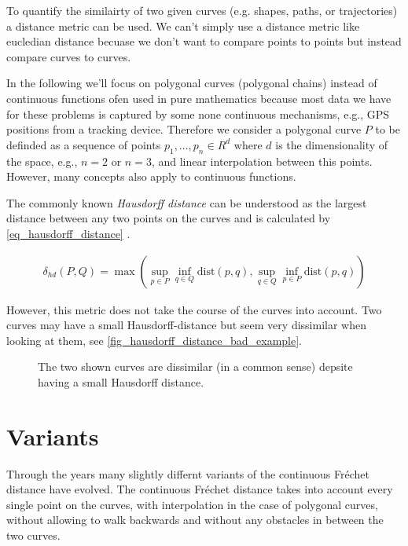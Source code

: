 \documentclass[
oneside,
fontsize=11pt
]{scrartcl}
\begin{document}
To quantify the similairty of two given curves (e.g. shapes, paths, or trajectories)
a distance metric can be used. 
We can't simply use a distance metric like eucledian distance 
becuase we don't want to compare points to points 
but instead compare curves to curves. 

In the following we'll focus on polygonal curves (polygonal chains) 
instead of continuous functions ofen used in pure mathematics 
because most data we have for these problems is 
captured by some none continuous mechanisms, e.g., GPS positions from a tracking device.
Therefore we consider a polygonal curve $P$ to be definded as a 
sequence of points $p_1, \dots, p_n \in R^d$ where $d$ is the dimensionality 
of the space, e.g., $n=2$ or $n=3$, and linear interpolation between this points. 
However, many concepts also apply to continuous functions.


The commonly known \textit{Hausdorff distance} can be understood 
as the largest distance between any two points on the curves 
and is calculated by \autoref{eq_hausdorff_distance} \cite{alt_computing_1995}.

\begin{align}
  \label{eq_hausdorff_distance}
  \delta_{hd}(P,Q) = \max \left( \sup_{p \in P} \inf_{q \in Q} \text{dist}(p,q), \sup_{q \in Q} \inf_{p \in P} \text{dist}(p,q) \right)
\end{align}

However, this metric does not take the course of the curves into account. 
Two curves may have a small Hausdorff-distance but seem very dissimilar 
when looking at them, see \autoref{fig_hausdorff_distance_bad_example}.

\begin{figure}[ht]
  \caption[Hausdorff distance of two dissimilar curves]{The two shown curves are dissimilar (in a common sense) depsite having a small Hausdorff distance.}
  \label{fig_hausdorff_distance_bad_example}
\end{figure}







\section{Variants}
Through the years many slightly differnt variants of the continuous Fréchet distance have evolved. 
The continuous Fréchet distance takes into account every single point on the curves, 
with interpolation in the case of polygonal curves, 
without allowing to walk backwards 
and without any obstacles in between the two curves.
\end{document}
